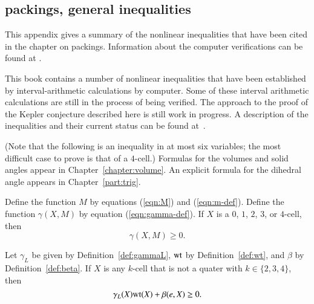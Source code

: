 \subsection{packings, general inequalities}

This appendix gives a summary of the nonlinear inequalities that have
been cited in the chapter on packings.  Information about the computer
verifications can be found at \cite{hales:2009:nonlinear}.


\begin{note}%
This book contains a number of nonlinear inequalities that have been
established by interval-arithmetic calculations by computer.  Some
of these interval arithmetic calculations are still in the process
of being verified.  The approach to the proof of the Kepler
conjecture described here is still work in progress.  A description
of the inequalities and their current status can be found
at~\cite{hales:2009:nonlinear}.
\end{note}


(Note that the following is an inequality in at most six variables; the most
difficult case to prove is that of a $4$-cell.)  Formulas for the
volumes and solid angles appear in Chapter~\ref{chapter:volume}.  An
explicit formula for the dihedral angle appears in
Chapter~\ref{part:trig}.


\begin{calculation}\label{calc:marchal}
Define the function $M$ by equations (\ref{eqn:M}) and
(\ref{eqn:m-def}).  Define the function $\gamma(X,M)$ by equation
(\ref{eqn:gamma-def}).  If $X$ is a $0$, $1$, $2$, $3$, or $4$-cell,
then
\begin{displaymath}
\gamma(X,M)\ge 0.
\end{displaymath}
\end{calculation}

\begin{calculation}\label{calc:cc:qtr}
Let $\gamma_L$ be given by Definition~\ref{def:gammaL}, ${\operatorname{wt}}$ by
Definition~\ref{def:wt}, and $\beta$ by Definition~\ref{def:beta}.
If $X$ is any $k$-cell that is not a quater with $k\in\{2,3,4\}$,
then %
\begin{displaymath}
\gamma_L(X) {\operatorname{wt}}(X) + \beta(e,X)\ge 0.
\end{displaymath} 
\end{calculation}


